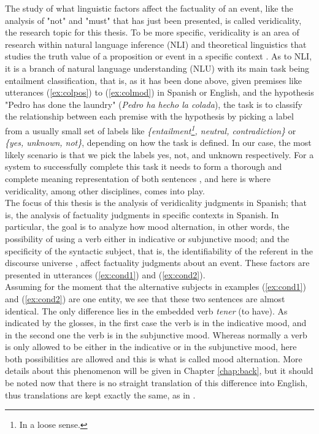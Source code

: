 The study of what linguistic factors affect the factuality of an event, like the analysis of "not" and "must" that has just been presented, is called veridicality, the research topic for this thesis. To be more specific, veridicality is an area of research within natural language inference (NLI) and theoretical linguistics that studies the truth value of a proposition or event in a specific context \citep{giannakidou2014non,giannakidou2015mixed}. As to NLI, it is a branch of natural language understanding (NLU) with its main task being entailment classification, that is, as it has been done above, given premises like utterances (\ref{ex:colpos}) to (\ref{ex:colmod}) in Spanish or English, and the hypothesis "Pedro has done the laundry" (\textit{Pedro ha hecho la colada}), the task is to classify the relationship between each premise with the hypothesis by picking a label from a usually small set of labels like \textit{\{entailment\footnote{In a loose sense.}, neutral, contradiction\}} \citep{williams2017broad} or \textit{\{yes, unknown, not\}}, depending on how the task is defined. In our case, the most likely scenario is that we pick the labels yes, not, and unknown respectively. For a system to successfully complete this task it needs to form a thorough and complete meaning representation of both sentences \citep{williams2017broad}, and here is where veridicality, among other disciplines, comes into play.\\ 

The focus of this thesis is the analysis of veridicality judgments in Spanish; that is, the analysis of factuality judgments in specific contexts in Spanish. In particular, the goal is to analyze how mood alternation, in other words, the possibility of using a verb either in indicative or subjunctive mood; and the specificity of the syntactic subject, that is, the identifiability of the referent in the discourse universe \citep{caudet1999expresiones}, affect factuality judgments about an event. These factors are presented in utterances (\ref{ex:cond1}) and (\ref{ex:cond2}).\\

Assuming for the moment that the alternative subjects in examples (\ref{ex:cond1}) and (\ref{ex:cond2}) are one entity, we see that these two sentences are almost identical. The only difference lies in the embedded verb \textit{tener} (to have). As indicated by the glosses, in the first case the verb is in the indicative mood, and in the second one the verb is in the subjunctive mood. Whereas normally a verb is only allowed to be either in the indicative or in the subjunctive mood, here both possibilities are allowed and this is what is called mood alternation. More details about this phenomenon will be given in Chapter \ref{chap:back}, but it should be noted now that there is no straight translation of this difference into English, thus translations are kept exactly the same, as in \citet{faulkner2021systematic}.\\

